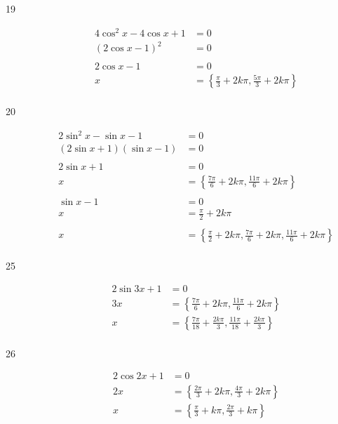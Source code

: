 \documentclass{exam}
\begin{document}
\begin{description}
      \item[19] 
        \begin{align*}
          4 \cos^2 x - 4 \cos x + 1 & = 0 \\
          (2 \cos x - 1)^2 & = 0 \\
          \\
          2 \cos x - 1 & = 0 \\
          x            & = \boxed{ \left\{ \frac{\pi}{3} + 2k \pi, \frac{5 \pi}{3} + 2k \pi \right\} } \\
        \end{align*}

      \item[20] 
        \begin{align*}
          2 \sin^2 x - \sin x - 1 & = 0 \\
          (2 \sin x + 1) (\sin x - 1) & = 0 \\
          \\
          2 \sin x + 1 & = 0 \\
          x            & = \left\{ \frac{7 \pi}{6} + 2k \pi, \frac{11 \pi}{6} + 2k \pi \right\} \\
          \\
          \sin x - 1 & = 0 \\
          x          & = \frac{\pi}{2} + 2k \pi \\
          \\
          x & = \boxed{ \left\{ \frac{\pi}{2} + 2k \pi, \frac{7 \pi}{6} + 2k \pi, \frac{11 \pi}{6} + 2k \pi \right\} } \\
        \end{align*}

      \item[25] 
        \begin{align*}
          2 \sin 3x + 1 & = 0 \\
          3x            & = \left\{ \frac{7 \pi}{6} + 2k \pi, \frac{11 \pi}{6} + 2k \pi \right\} \\
          x             & = \boxed{ \left\{ \frac{7 \pi}{18} + \frac{2k \pi}{3}, \frac{11 \pi}{18} + \frac{2k \pi}{3} \right\} } \\
        \end{align*}

      \item[26] 
        \begin{align*}
          2 \cos 2x + 1 & = 0 \\
          2x            & = \left\{ \frac{2 \pi}{3} + 2k \pi, \frac{4 \pi}{3} + 2k \pi \right\} \\
          x             & = \boxed{ \left\{ \frac{\pi}{3} + k \pi, \frac{2 \pi}{3} + k \pi \right\} } \\
        \end{align*}


\end{description}
\end{document}
